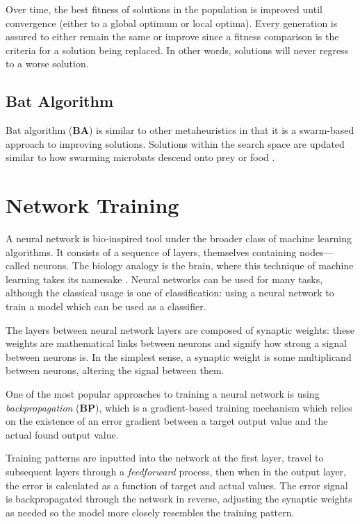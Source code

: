 \documentclass[a4paper,12pt]{article}
\begin{document}
Over time, the best fitness of solutions in the population is improved until convergence (either to a global optimum or local optima). Every generation is assured to either remain the same or improve since a fitness comparison is the criteria for a solution being replaced. In other words, solutions will never regress to a worse solution.

\subsection{Bat Algorithm}

Bat algorithm (\textbf{BA}) is similar to other metaheuristics in that it is a swarm-based approach to improving solutions. Solutions within the search space are updated similar to how swarming microbats descend onto prey or food \cite{ba}.

\section{Network Training}

A neural network is bio-inspired tool under the broader class of machine learning algorithms. It consists of a sequence of layers, themselves containing nodes---called neurons. The biology analogy is the brain, where this technique of machine learning takes its namesake  \cite{mitchell}. Neural networks can be used for many tasks, although the classical usage is one of classification: using a neural network to train a model which can be used as a classifier.

The layers between neural network layers are composed of synaptic weights: these weights are mathematical links between neurons and signify how strong a signal between neurons is. In the simplest sense, a synaptic weight is some multiplicand between neurons, altering the signal between them.

One of the most popular approaches to training a neural network is using \textit{backpropagation} (\textbf{BP}), which is a gradient-based training mechanism which relies on the existence of an error gradient between a target output value and the actual found output value. 

Training patterns are inputted into the network at the first layer, travel to subsequent layers through a \textit{feedforward} process, then when in the output layer, the error is calculated as a function of target and actual values. The error signal is backpropagated through the network in reverse, adjusting the synaptic weights as needed so the model more closely resembles the training pattern.
\end{document}

